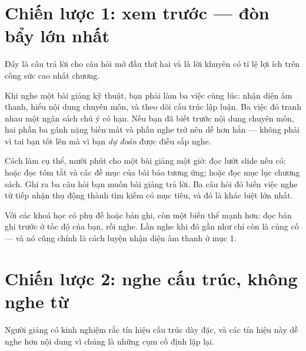 \documentclass[../../english.tex]{subfiles}
\begin{document}
\section{Chiến lược 1: xem trước --- đòn bẩy lớn nhất}

Đây là câu trả lời cho câu hỏi mở đầu thứ hai và là lời khuyên có tỉ lệ lợi ích trên công sức cao nhất chương.

Khi nghe một bài giảng kỹ thuật, bạn phải làm ba việc cùng lúc: nhận diện âm thanh, hiểu nội dung chuyên môn, và theo dõi cấu trúc lập luận. Ba việc đó tranh nhau một ngân sách chú ý có hạn. Nếu bạn đã biết trước nội dung chuyên môn, hai phần ba gánh nặng biến mất và phần nghe trở nên dễ hơn hẳn --- không phải vì tai bạn tốt lên mà vì bạn \emph{dự đoán} được điều sắp nghe.

Cách làm cụ thể, mười phút cho một bài giảng một giờ: đọc lướt slide nếu có; hoặc đọc tóm tắt và các đề mục của bài báo tương ứng; hoặc đọc mục lục chương sách. Ghi ra ba câu hỏi bạn muốn bài giảng trả lời. Ba câu hỏi đó biến việc nghe từ tiếp nhận thụ động thành tìm kiếm có mục tiêu, và đó là khác biệt lớn nhất.

Với các khoá học có phụ đề hoặc bản ghi, còn một biến thể mạnh hơn: đọc bản ghi trước ở tốc độ của bạn, rồi nghe. Lần nghe khi đó gần như chỉ còn là củng cố --- và nó cũng chính là cách luyện nhận diện âm thanh ở mục 1.

\section{Chiến lược 2: nghe cấu trúc, không nghe từ}

Người giảng có kinh nghiệm rắc tín hiệu cấu trúc dày đặc, và các tín hiệu này dễ nghe hơn nội dung vì chúng là những cụm cố định lặp lại.
\end{document}

